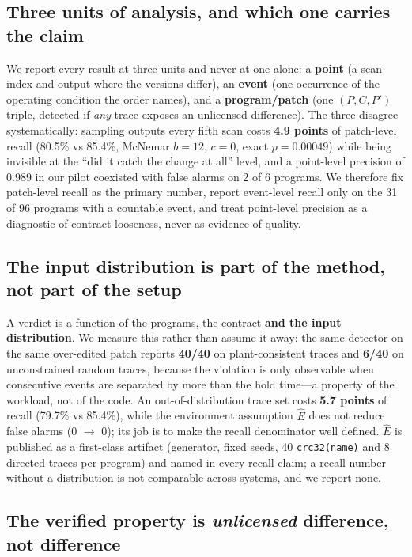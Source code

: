 \documentclass[acmsmall,screen,review,anonymous]{acmart}
\begin{document}
\subsection{Three units of analysis, and which one carries the claim}

We report every result at three units and never at one alone: a \textbf{point} (a scan index and output where the versions differ), an \textbf{event} (one occurrence of the operating condition the order names), and a \textbf{program/patch} (one $(P,C,P')$ triple, detected if \emph{any} trace exposes an unlicensed difference). The three disagree systematically: sampling outputs every fifth scan costs \textbf{4.9 points} of patch-level recall (80.5\% vs 85.4\%, McNemar $b=12$, $c=0$, exact $p=0.00049$) while being invisible at the ``did it catch the change at all'' level, and a point-level precision of 0.989 in our pilot coexisted with false alarms on 2 of 6 programs. We therefore fix patch-level recall as the primary number, report event-level recall only on the 31 of 96 programs with a countable event, and treat point-level precision as a diagnostic of contract looseness, never as evidence of quality.

\subsection{The input distribution is part of the method, not part of the setup}

A verdict is a function of the programs, the contract \textbf{and the input distribution}. We measure this rather than assume it away: the same detector on the same over-edited patch reports \textbf{40/40} on plant-consistent traces and \textbf{6/40} on unconstrained random traces, because the violation is only observable when consecutive events are separated by more than the hold time---a property of the workload, not of the code. An out-of-distribution trace set costs \textbf{5.7 points} of recall (79.7\% vs 85.4\%), while the environment assumption $\hat{E}$ does not reduce false alarms (0 $\to$ 0); its job is to make the recall denominator well defined. $\hat{E}$ is published as a first-class artifact (generator, fixed seeds, 40 \texttt{crc32(name)} and 8 directed traces per program) and named in every recall claim; a recall number without a distribution is not comparable across systems, and we report none.

\subsection{The verified property is \emph{unlicensed} difference, not difference}
\label{sec:misses}
\end{document}
